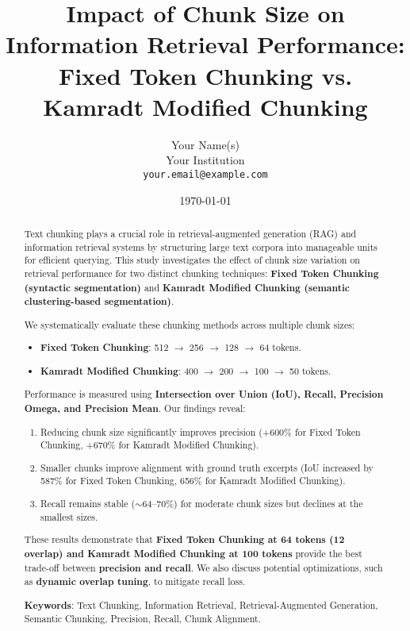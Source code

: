 \documentclass[a4paper,12pt]{article}
\title{\textbf{Impact of Chunk Size on Information Retrieval Performance: \\ Fixed Token Chunking vs. Kamradt Modified Chunking}}
\author{Your Name(s) \\ Your Institution \\ \texttt{your.email@example.com}}
\date{\today}
\begin{document}
\maketitle

\begin{abstract}
Text chunking plays a crucial role in retrieval-augmented generation (RAG) and information retrieval systems by structuring large text corpora into manageable units for efficient querying. This study investigates the effect of chunk size variation on retrieval performance for two distinct chunking techniques: \textbf{Fixed Token Chunking (syntactic segmentation)} and \textbf{Kamradt Modified Chunking (semantic clustering-based segmentation)}. 

We systematically evaluate these chunking methods across multiple chunk sizes:
\begin{itemize}
    \item \textbf{Fixed Token Chunking}: 512 $\rightarrow$ 256 $\rightarrow$ 128 $\rightarrow$ 64 tokens.
    \item \textbf{Kamradt Modified Chunking}: 400 $\rightarrow$ 200 $\rightarrow$ 100 $\rightarrow$ 50 tokens.
\end{itemize}

Performance is measured using \textbf{Intersection over Union (IoU), Recall, Precision Omega, and Precision Mean}. Our findings reveal:
\begin{enumerate}
    \item Reducing chunk size significantly improves precision (+600\% for Fixed Token Chunking, +670\% for Kamradt Modified Chunking).
    \item Smaller chunks improve alignment with ground truth excerpts (IoU increased by 587\% for Fixed Token Chunking, 656\% for Kamradt Modified Chunking).
    \item Recall remains stable ($\sim$64–70\%) for moderate chunk sizes but declines at the smallest sizes.
\end{enumerate}

These results demonstrate that \textbf{Fixed Token Chunking at 64 tokens (12 overlap) and Kamradt Modified Chunking at 100 tokens} provide the best trade-off between \textbf{precision and recall}. We also discuss potential optimizations, such as \textbf{dynamic overlap tuning}, to mitigate recall loss. 

\textbf{Keywords}: Text Chunking, Information Retrieval, Retrieval-Augmented Generation, Semantic Chunking, Precision, Recall, Chunk Alignment.
\end{abstract}
\end{document}
